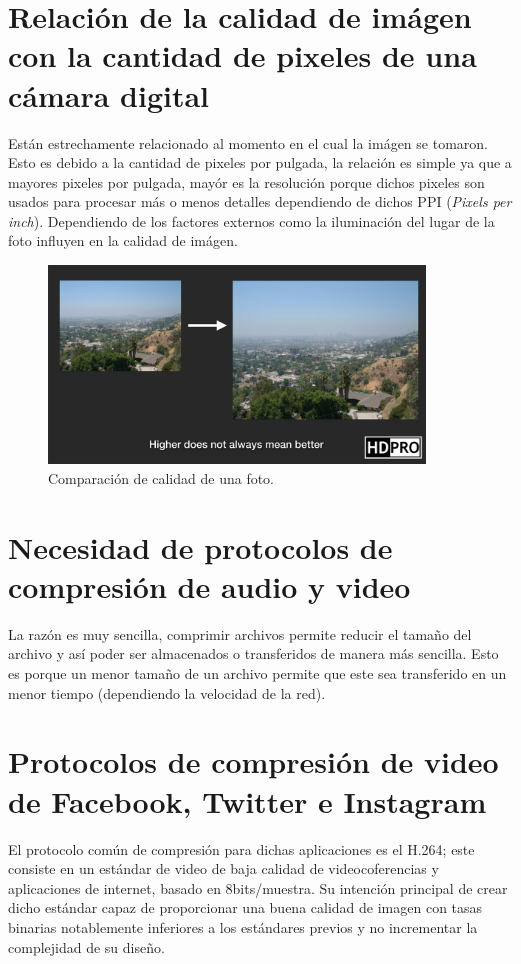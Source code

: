 \documentclass[letterpaper, 12pt]{article}
\begin{document}
    \section{Relación de la calidad de imágen con la cantidad de pixeles de una cámara digital}
    \justify
    Están estrechamente relacionado al momento en el cual la imágen se tomaron. Esto es debido a la cantidad de pixeles por pulgada, la relación es simple ya que a mayores pixeles por pulgada, mayór es la resolución porque dichos pixeles son usados para procesar más o menos detalles
    dependiendo de dichos PPI (\emph{Pixels per inch}). Dependiendo de los factores externos como la iluminación del lugar de la foto influyen en la calidad de imágen.
    \begin{figure}[H]
        \centering
        \includegraphics[width=10cm]{higlow.png}
        \caption{Comparación de calidad de una foto.}
    \end{figure}
    \section{Necesidad de protocolos de compresión de audio y video}
    \justify
    La razón es muy sencilla, comprimir archivos permite reducir el tamaño del archivo y así poder ser almacenados o transferidos de manera más sencilla. Esto es porque un menor tamaño de un archivo permite que este sea transferido en un menor tiempo (dependiendo la velocidad de la red).
    \section{Protocolos de compresión de video de Facebook, Twitter e Instagram}
    \justify
    El protocolo común de compresión para dichas aplicaciones es el H.264; este consiste en un estándar de video de baja calidad de videocoferencias y aplicaciones de internet, basado en 8bits/muestra. Su intención principal de crear dicho estándar capaz de proporcionar una buena calidad de imagen
    con tasas binarias notablemente inferiores a los estándares previos y no incrementar la complejidad de su diseño.
    \newpage
    \thispagestyle{empty}
    \printbibliography
\end{document}
